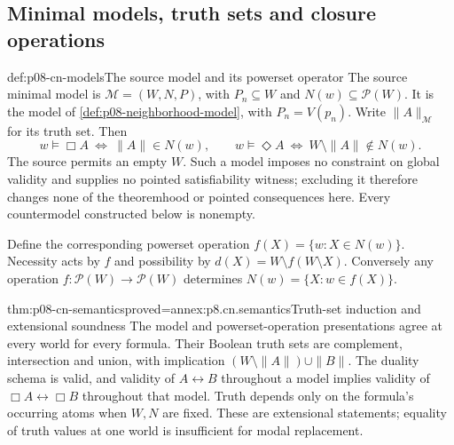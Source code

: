 \subsection{Minimal models, truth sets and closure operations}
\label{sec:p08-cn-models}

\begin{hbdefinition}{def:p08-cn-models}{The source model and its powerset operator}
The source minimal model is \(\mathcal M=(W,N,P)\), with
\(P_n\subseteq W\) and \(N(w)\subseteq\mathcal P(W)\).
It is the model of \ref{def:p08-neighborhood-model}, with
\(P_n=V(p_n)\). Write \(\|A\|_{\mathcal M}\) for its truth
set. Then
\[
 w\models\Box A\ \Longleftrightarrow\ \|A\|\in N(w),
 \qquad
 w\models\Diamond A\ \Longleftrightarrow\ W\setminus\|A\|\notin N(w).
\]
The source permits an empty \(W\). Such a model imposes no
constraint on global validity and supplies no pointed satisfiability
witness; excluding it therefore changes none of the theoremhood or
pointed consequences here. Every countermodel constructed below is nonempty.

Define the corresponding powerset operation
\(f(X)=\{w:X\in N(w)\}\). Necessity acts by \(f\) and
possibility by \(d(X)=W\setminus f(W\setminus X)\).
Conversely any operation \(f:\mathcal P(W)\to\mathcal P(W)\)
determines \(N(w)=\{X:w\in f(X)\}\).
\end{hbdefinition}

\begin{hblemma}{thm:p08-cn-semantics}{proved=annex:p8.cn.semantics}{Truth-set induction and extensional soundness}
The model and powerset-operation presentations agree at every world
for every formula. Their Boolean truth sets are complement, intersection
and union, with implication \((W\setminus\|A\|)\cup\|B\|\).
The duality schema is valid, and validity of \(A\leftrightarrow B\)
throughout a model implies validity of
\(\Box A\leftrightarrow\Box B\) throughout that model.
Truth depends only on the formula's occurring atoms when \(W,N\)
are fixed. These are extensional statements; equality of truth values
at one world is insufficient for modal replacement.
\end{hblemma}

